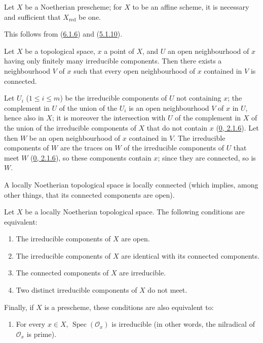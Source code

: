 \begin{corollary}[6.1.7]
\label{I.6.1.7}
Let $X$ be a Noetherian prescheme; for $X$ to be an affine scheme, it is
necessary and sufficient that $X_{\mathrm{red}}$ be one.
\end{corollary}

This follows from (\hyperref[I.6.1.6]{6.1.6}) and
(\hyperref[I.5.1.10]{5.1.10}).

\begin{lemma}[6.1.8]
\label{I.6.1.8}
Let $X$ be a topological space, $x$ a point of $X$, and $U$ an open
neighbourhood of $x$ having only finitely many irreducible components. Then
there exists a neighbourhood $V$ of $x$ such that every open neighbourhood of
$x$ contained in $V$ is connected.
\end{lemma}

Let $U_i$ ($1\leq i\leq m$) be the irreducible components of $U$ not
containing $x$; the complement in $U$ of the union of the $U_i$ is an
open neighbourhood $V$ of $x$ in $U$, hence also in $X$; it is moreover
the intersection with $U$ of the complement in $X$ of the union of the
irreducible components of $X$ that do not contain $x$
(\hyperref[0.2.1.6]{0, 2.1.6}). Let then $W$ be an open neighbourhood of
$x$ contained in $V$. The irreducible components of $W$ are the traces on $W$
of the irreducible components of $U$ that meet $W$
(\hyperref[0.2.1.6]{0, 2.1.6}), so these components contain $x$; since
they are connected, so is $W$.

\begin{corollary}[6.1.9]
\label{I.6.1.9}
A locally Noetherian topological space is locally connected (which
implies, among other things, that its connected components are open).
\end{corollary}

\begin{proposition}[6.1.10]
\label{I.6.1.10}
Let $X$ be a locally Noetherian topological space. The following conditions
are equivalent:
\begin{enumerate}
  \item[a)] The irreducible components of $X$ are open.
  \item[b)] The irreducible components of $X$ are identical with its
    connected components.
  \item[c)] The connected components of $X$ are irreducible.
  \item[d)] Two distinct irreducible components of $X$ do not
    meet.
\end{enumerate}

Finally, if $X$ is a prescheme, these conditions are also equivalent to:
\begin{enumerate}
  \item[e)] For every $x\in X$, $\operatorname{Spec}(\mathscr{O}_x)$ is
    irreducible (in other words, the nilradical of $\mathscr{O}_x$ is prime).
\end{enumerate}
\end{proposition}

